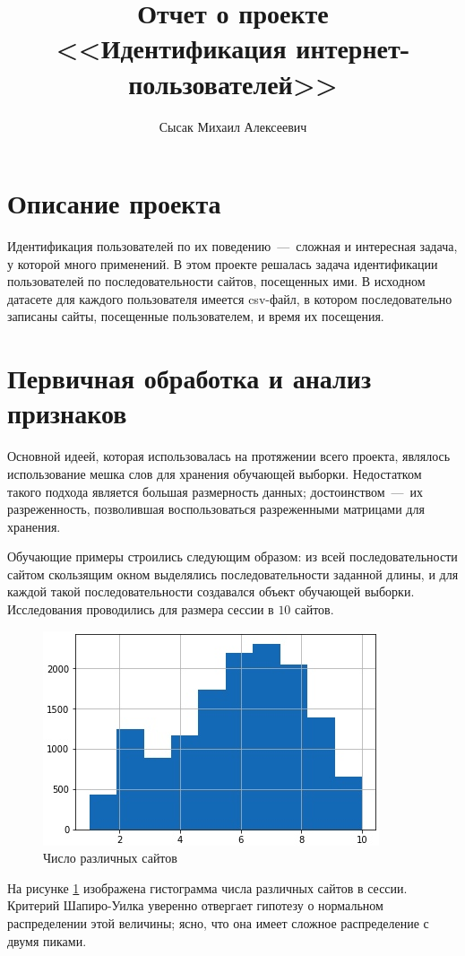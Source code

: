 \documentclass[12pt,a4paper]{article}
\author{Сысак Михаил Алексеевич}
\title{Отчет о проекте \\ <<Идентификация интернет-пользователей>>}
\theoremstyle{plain}
\theoremstyle{definition}
\theoremstyle{remark}
\renewcommand{\%}[1]{\,\text{mod} \,#1}
\begin{document}
	\maketitle
	\section{Описание проекта}
	Идентификация пользователей по их поведению~---~сложная и интересная задача, у которой много применений. В этом проекте решалась задача идентификации пользователей по последовательности сайтов, посещенных ими. В исходном датасете для каждого пользователя имеется csv-файл, в котором последовательно записаны сайты, посещенные пользователем, и время их посещения.
	\section{Первичная обработка и анализ признаков}
	Основной идеей, которая использовалась на протяжении всего проекта, являлось использование мешка слов для хранения обучающей выборки. Недостатком такого подхода является большая размерность данных; достоинством~---~их разреженность, позволившая воспользоваться разреженными матрицами для хранения. 
	
	Обучающие примеры строились следующим образом: из всей последовательности сайтом скользящим окном выделялись последовательности заданной длины, и для каждой такой последовательности создавался объект обучающей выборки. Исследования проводились для размера сессии в $10$ сайтов.
	
	\begin{figure}
		\includegraphics[scale=0.5]{pic1.jpg}
		\caption{Число различных сайтов}\label{pic1}
	\end{figure}
	На рисунке \ref{pic1} изображена гистограмма числа различных сайтов в сессии. Критерий Шапиро-Уилка уверенно отвергает гипотезу о нормальном распределении этой величины; ясно, что она имеет сложное распределение с двумя пиками.
	
\end{document}
